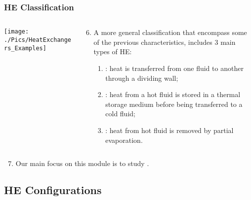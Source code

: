 \documentclass[10pt,compress,handout,ignorenonframetext,unknownkeysallowed]{beamer}
\begin{document}
\begin{frame}
 \frametitle{HE Classification}
    \begin{columns}
       \begin{column}[l]{0.58\linewidth}
         \texttt{[image: ./Pics/HeatExchangers\_Examples]}
       \end{column}
       \begin{column}[l]{0.42\linewidth}
          \begin{enumerate}\setcounter{enumi}{5}%
              \item<1-> A more general classification that encompass some of the previous characteristics, includes 3 main types of HE:
                \begin{enumerate}
                  \item<1-> : heat is transferred from one fluid to another through a dividing wall;
                  \item<2-> : heat from a hot fluid is stored in a thermal storage medium before being transferred to a cold fluid;
                  \item<3-> : heat from hot fluid is removed by partial evaporation.
                \end{enumerate}
          \end{enumerate}
       \end{column}      
    \end{columns}
          \begin{enumerate}\setcounter{enumi}{6}%
               \item<4-> Our main focus on this module is to study \underline{}.
          \end{enumerate}
\end{frame}


\subsection{HE Configurations}
\end{document}
